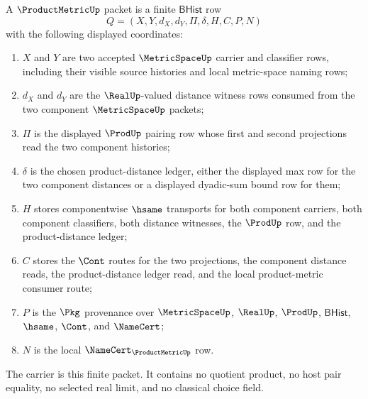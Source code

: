 \begin{definition}
\label{def:productmetric-bhist-carrier}
A $\ProductMetricUp$ packet is a finite $\mathsf{BHist}$ row
$$
Q=(X,Y,d_X,d_Y,\Pi,\delta,H,C,P,N)
$$
with the following displayed coordinates:
\begin{enumerate}
\item $X$ and $Y$ are two accepted $\MetricSpaceUp$ carrier and classifier rows, including their visible source histories and local metric-space naming rows;
\item $d_X$ and $d_Y$ are the $\RealUp$-valued distance witness rows consumed from the two component $\MetricSpaceUp$ packets;
\item $\Pi$ is the displayed $\ProdUp$ pairing row whose first and second projections read the two component histories;
\item $\delta$ is the chosen product-distance ledger, either the displayed max row for the two component distances or a displayed dyadic-sum bound row for them;
\item $H$ stores componentwise $\hsame$ transports for both component carriers, both component classifiers, both distance witnesses, the $\ProdUp$ row, and the product-distance ledger;
\item $C$ stores the $\Cont$ routes for the two projections, the component distance reads, the product-distance ledger read, and the local product-metric consumer route;
\item $P$ is the $\Pkg$ provenance over $\MetricSpaceUp$, $\RealUp$, $\ProdUp$, $\mathsf{BHist}$, $\hsame$, $\Cont$, and $\NameCert$;
\item $N$ is the local $\NameCert_{\ProductMetricUp}$ row.
\end{enumerate}
The carrier is this finite packet. It contains no quotient product, no host pair equality, no selected real limit, and no classical choice field.
\end{definition}

